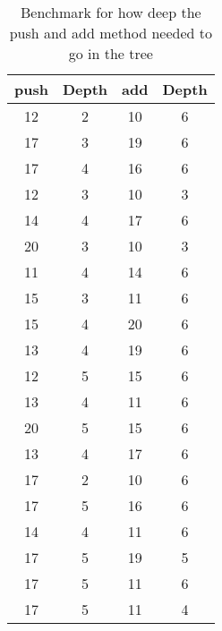 \documentclass[a4paper,11pt]{article}
\begin{document}
\begin{table}[h!]
    \begin{center}
        \begin{tabular}{|c|c|c|c|}
            \hline
            \textbf{push} & \textbf{Depth} & \textbf{add} & \textbf{Depth}\\
            \hline
             12        & 2    & 10    & 6                           \\
             17        & 3    & 19    & 6                           \\
             17        & 4    & 16    & 6                           \\
             12        & 3    & 10    & 3                           \\
             14        & 4    & 17    & 6                           \\
             20        & 3    & 10    & 3                           \\
             11        & 4    & 14    & 6                           \\
             15        & 3    & 11    & 6                           \\
             15        & 4    & 20    & 6                           \\
             13        & 4    & 19    & 6                           \\
             12        & 5    & 15    & 6                           \\
             13        & 4    & 11    & 6                           \\
             20        & 5    & 15    & 6                           \\
             13        & 4    & 17    & 6                           \\
             17        & 2    & 10    & 6                           \\
             17        & 5    & 16    & 6                           \\
             14         &4    & 11    & 6                           \\
             17         &5    & 19    & 5                           \\
             17         &5    & 11    & 6                           \\
             17         &5    & 11    & 4                           \\
            \hline
        \end{tabular}
        \caption{Benchmark for how deep the push and add method needed to go in the tree}
        \label{tab:tree}
    \end{center}
\end{table}
\FloatBarrier
\end{document}
